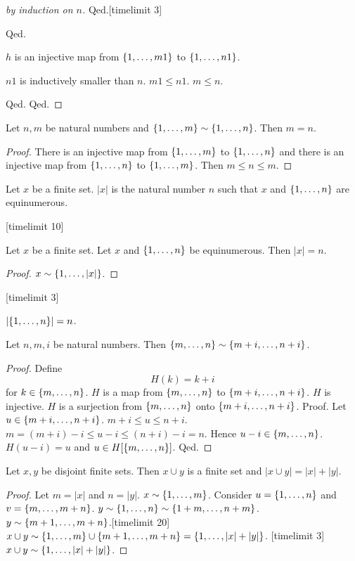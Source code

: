 \documentclass{article}
\begin{document}
\begin{forthel}
\begin{proof}[by induction on $n$]
Qed.[timelimit 3]

Qed.




$h$ is an injective map from $\{1,\dots,m1\}$ to $\{1,\dots,n1\}$. 

$n1$ is inductively smaller than $n$.
$m1 \leq n1$. $m \leq n$.

Qed.
Qed.
\end{proof}


\begin{lemma}
Let $n,m$ be natural numbers and
$\{1,\dots,m\} \sim \{1,\dots,n\}$. Then $m = n$.
\end{lemma}
\begin{proof}
There is an injective map from 
$\{1,\dots,m\}$ to $\{1,\dots,n\}$ and
there is an injective map from 
$\{1,\dots,n\}$ to $\{1,\dots,m\}$. Then $m \leq n \leq m$.
\end{proof}

\begin{signature}
Let $x$ be a finite set. $|x|$ is the natural number $n$
such that $x$ and $\{1,\dots,n\}$ are equinumerous.
\end{signature}

[timelimit 10]
\begin{lemma} Let $x$ be a finite set.
Let $x$ and $\{1,\dots,n\}$ be equinumerous. Then
$|x| = n$.
\end{lemma}
\begin{proof}
$x \sim \{1,\dots,|x|\}$.
\end{proof}[timelimit 3]

\begin{lemma}
$|\{1,\dots,n\}| = n$.
\end{lemma}

\begin{lemma}
Let $n,m,i$ be natural numbers.
Then $\{m,\dots,n\} \sim \{m+i,\dots,n+i\}$.
\end{lemma}
\begin{proof}
Define \[ H(k) = k + i \]
        for $k \in \{m,\dots,n\}$.
$H$ is a map from $\{m,\dots,n\}$ to $\{m+i,\dots,n+i\}$.
$H$ is injective.
$H$ is a surjection from $\{m,\dots,n\}$ onto $\{m+i,\dots,n+i\}$.
Proof.
Let $u \in \{m+i,\dots,n+i\}$. $m + i \leq u \leq n + i$.
$m  = (m + i) - i \leq u - i \leq (n + i) - i = n$.
Hence $u - i \in \{m,\dots,n\}$. $H(u-i) = u$ and 
$u \in H[\{m,\dots,n\}]$.
Qed.
\end{proof}

\begin{lemma}
Let $x,y$ be disjoint finite sets.
Then $x \cup y$ is a finite set and $|x \cup y| = |x| + |y|$.
\end{lemma}
\begin{proof}
Let $m = |x|$ and $n = |y|$.
$x \sim \{1,\dots,m\}$.
Consider $u = \{1,\dots,n\}$ and $v = \{m,\dots,m+n\}$. 
$y \sim \{1,\dots,n\} \sim \{1+m,\dots,n+m\}$.
$y \sim \{m+1,\dots,m+n\}$.[timelimit 20]
$x \cup y \sim \{1,\dots,m\} \cup \{m+1,\dots,m+n\} = \{1,\dots,|x|+|y|\}$. [timelimit 3]
$x \cup y \sim \{1,\dots,|x|+|y|\}$.
\end{proof}



\end{forthel}
\end{document}
